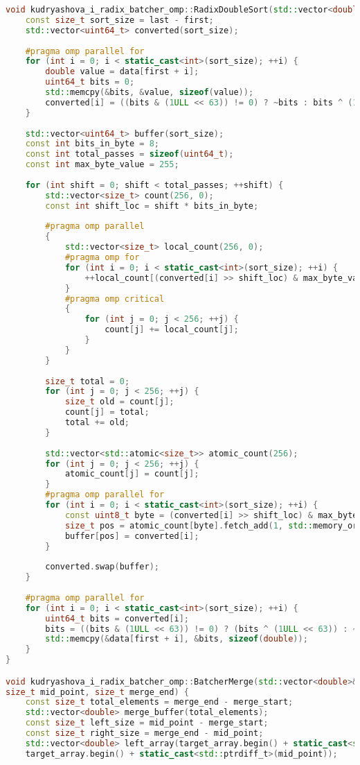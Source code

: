 \documentclass[12pt,a4paper]{extarticle}
\begin{document}
\begin{lstlisting}[language=C++]
void kudryashova_i_radix_batcher_omp::RadixDoubleSort(std::vector<double>& data, size_t first, size_t last) {
	const size_t sort_size = last - first;
	std::vector<uint64_t> converted(sort_size);
	
	#pragma omp parallel for
	for (int i = 0; i < static_cast<int>(sort_size); ++i) {
		double value = data[first + i];
		uint64_t bits = 0;
		std::memcpy(&bits, &value, sizeof(value));
		converted[i] = ((bits & (1ULL << 63)) != 0) ? ~bits : bits ^ (1ULL << 63);
	}
	
	std::vector<uint64_t> buffer(sort_size);
	const int bits_in_byte = 8;
	const int total_passes = sizeof(uint64_t);
	const int max_byte_value = 255;
	
	for (int shift = 0; shift < total_passes; ++shift) {
		std::vector<size_t> count(256, 0);
		const int shift_loc = shift * bits_in_byte;
		
		#pragma omp parallel
		{
			std::vector<size_t> local_count(256, 0);
			#pragma omp for
			for (int i = 0; i < static_cast<int>(sort_size); ++i) {
				++local_count[(converted[i] >> shift_loc) & max_byte_value];
			}
			#pragma omp critical
			{
				for (int j = 0; j < 256; ++j) {
					count[j] += local_count[j];
				}
			}
		}
		
		size_t total = 0;
		for (int j = 0; j < 256; ++j) {
			size_t old = count[j];
			count[j] = total;
			total += old;
		}
		
		std::vector<std::atomic<size_t>> atomic_count(256);
		for (int j = 0; j < 256; ++j) {
			atomic_count[j] = count[j];
		}
		#pragma omp parallel for
		for (int i = 0; i < static_cast<int>(sort_size); ++i) {
			const uint8_t byte = (converted[i] >> shift_loc) & max_byte_value;
			size_t pos = atomic_count[byte].fetch_add(1, std::memory_order_seq_cst);
			buffer[pos] = converted[i];
		}
		
		converted.swap(buffer);
	}
	
	#pragma omp parallel for
	for (int i = 0; i < static_cast<int>(sort_size); ++i) {
		uint64_t bits = converted[i];
		bits = ((bits & (1ULL << 63)) != 0) ? (bits ^ (1ULL << 63)) : ~bits;
		std::memcpy(&data[first + i], &bits, sizeof(double));
	}
}

void kudryashova_i_radix_batcher_omp::BatcherMerge(std::vector<double>& target_array, size_t merge_start,
size_t mid_point, size_t merge_end) {
	const size_t total_elements = merge_end - merge_start;
	std::vector<double> merge_buffer(total_elements);
	const size_t left_size = mid_point - merge_start;
	const size_t right_size = merge_end - mid_point;
	std::vector<double> left_array(target_array.begin() + static_cast<std::ptrdiff_t>(merge_start),
	target_array.begin() + static_cast<std::ptrdiff_t>(mid_point));
	

\end{lstlisting}
\end{document}
